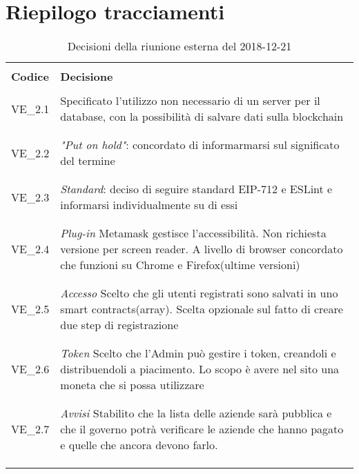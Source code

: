 \section{Riepilogo tracciamenti}
\begin{centering}
\begin{longtable}{ >{\centering}p{4cm} >{\centering}p{11cm} }

\hline
\\[0.5pt]
	\textbf{Codice} & \textbf{Decisione} 
	
	\tabularnewline 
	\hline
						
				\\[0.5pt]
				VE\_2.1 & Specificato l'utilizzo non necessario di un server per il database, con la possibilità di salvare dati sulla blockchain
				\\[0.5pt]
				\tabularnewline
				\hline
				
				\\[0.5pt]
				VE\_2.2 & \textit{"Put on hold"}: concordato di informarmarsi sul significato del termine
				\\[0.5pt]
				\tabularnewline
				\hline
				
				\\[0.5pt]				
				VE\_2.3 & \textit{Standard}: deciso di seguire standard EIP-712 e ESLint e informarsi individualmente su di essi
				\\[0.5pt]
				\tabularnewline
				\hline
				
				\\[0.5pt]
				VE\_2.4 & \textit{Plug-in} Metamask gestisce l'accessibilità. Non richiesta versione per screen reader. A livello di browser concordato che funzioni su Chrome e Firefox(ultime versioni)
				\\[0.5pt]
				\tabularnewline
				\hline
				
				\\[0.5pt]
				VE\_2.5 & \textit{Accesso} Scelto che gli utenti registrati sono salvati in uno smart contracts(array). Scelta opzionale sul fatto di creare due step di registrazione
				\\[0.5pt]
				\tabularnewline
				\hline  
				
				\\[0.5pt]
				VE\_2.6 & \textit{Token} Scelto che l'Admin può gestire i token, creandoli e distribuendoli a piacimento. Lo scopo è avere nel sito una moneta che si possa utilizzare
				\\[0.5pt]
				\tabularnewline
				\hline  
				
				\\[0.5pt]
				VE\_2.7 & \textit{Avvisi} Stabilito che la lista delle aziende sarà pubblica e che il governo potrà verificare le aziende che hanno pagato e quelle che ancora devono farlo.
				\\[0.5pt]
				\tabularnewline
				\hline  
                
        \\[0.7pt]
        \caption{Decisioni della riunione esterna del 2018-12-21}
\end{longtable}
\end{centering}

